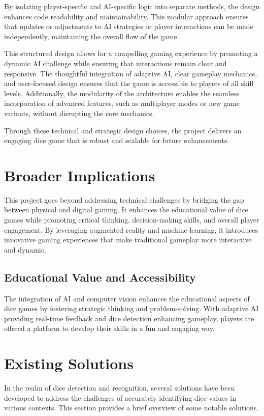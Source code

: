 By isolating player-specific and AI-specific logic into separate methods, the design enhances code readability and maintainability. This modular approach ensures that updates or adjustments to AI strategies or player interactions can be made independently, maintaining the overall flow of the game.

This structured design allows for a compelling gaming experience by promoting a dynamic AI challenge while ensuring that interactions remain clear and responsive. The thoughtful integration of adaptive AI, clear gameplay mechanics, and user-focused design ensures that the game is accessible to players of all skill levels. Additionally, the modularity of the architecture enables the seamless incorporation of advanced features, such as multiplayer modes or new game variants, without disrupting the core mechanics.

Through these technical and strategic design choices, the project delivers an engaging dice game that is robust and scalable for future enhancements.

\section{Broader Implications}

This project goes beyond addressing technical challenges by bridging the gap between physical and digital gaming. It enhances the educational value of dice games while promoting critical thinking, decision-making skills, and overall player engagement. By leveraging augmented reality and machine learning, it introduces innovative gaming experiences that make traditional gameplay more interactive and dynamic.

\subsection{Educational Value and Accessibility} The integration of AI and computer vision enhances the educational aspects of dice games by fostering strategic thinking and problem-solving. With adaptive AI providing real-time feedback and dice detection enhancing gameplay, players are offered a platform to develop their skills in a fun and engaging way. 

\section{Existing Solutions}

In the realm of dice detection and recognition, several solutions have been developed to address the challenges of accurately identifying dice values in various contexts. This section provides a brief overview of some notable solutions.

